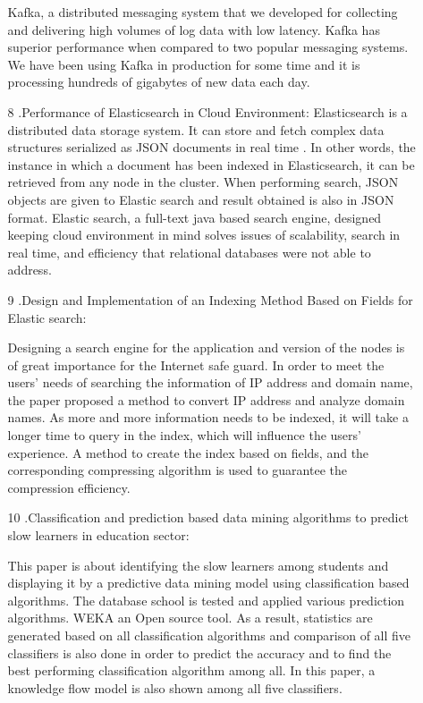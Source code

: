 \documentclass[oneside,a4paper,12pt]{book}
\begin{document}
\begin{enumerate}
\begin{itemize}
Kafka, a distributed messaging system that we developed for collecting and delivering high volumes of log data with low latency. Kafka has superior performance when compared to two popular messaging systems. We have been using Kafka in production for some time and it is processing hundreds of gigabytes of new data each day.

   \item[8].Performance of Elasticsearch in Cloud  Environment:
Elasticsearch is a distributed data storage system. It can store and fetch complex data structures serialized as JSON documents in real time . In other words, the instance in which a document has been indexed in Elasticsearch, it can be retrieved from any node in the cluster. When performing search, JSON objects are given to Elastic search and result obtained is also in JSON format. Elastic search, a full-text java based search engine, designed keeping cloud environment in mind solves issues of scalability, search in real time, and efficiency that relational databases were not able to address.

   \item[9].Design and Implementation of an Indexing Method Based on Fields for  Elastic search: 
 
Designing a search engine for the application and version of the nodes is of great importance for the Internet safe guard. In order to meet the users’ needs of searching the information of IP address and domain name, the paper proposed a method to convert IP address and analyze domain names. As more and more information needs to be indexed, it will take a longer time to query in the index, which will influence the users’ experience. A method to create the index based on fields, and the corresponding compressing algorithm is used to guarantee the compression efficiency. 

   \item[10].Classification and prediction based data mining algorithms to predict slow learners in education sector: 
 
This paper is about identifying the slow learners among students and displaying it by a predictive data mining model using classification based algorithms. The database school is tested and applied various prediction algorithms. WEKA an Open source tool. As a result, statistics are generated based on all classification algorithms and comparison of all five classifiers is also done in order to predict the accuracy and to find the best performing classification algorithm among all. In this paper, a knowledge flow model is also shown among all five classifiers.


\end{itemize}
\end{enumerate}
\end{document}

